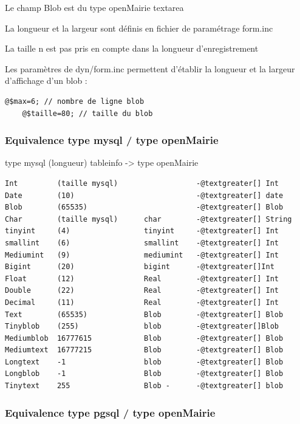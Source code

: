 \documentclass[letterpaper,10pt,french]{manual}
\begin{document}
Le champ Blob est du type openMairie textarea

La longueur et la largeur sont définis en fichier de paramétrage form.inc

La taille n est pas pris en compte dans la longueur d'enregistrement

Les paramètres de dyn/form.inc permettent d'établir la longueur et la largeur d'affichage d'un blob :

\begin{Verbatim}[commandchars=@\[\]]
@$max=6; // nombre de ligne blob
    @$taille=80; // taille du blob
\end{Verbatim}


\subsubsection{Equivalence type mysql / type openMairie}

type mysql (longueur)          tableinfo   -\textgreater{} type openMairie

\begin{Verbatim}[commandchars=@\[\]]
Int         (taille mysql)                  -@textgreater[] Int
Date        (10)                            -@textgreater[] date
Blob        (65535)                         -@textgreater[] Blob
Char        (taille mysql)      char        -@textgreater[] String
tinyint     (4)                 tinyint     -@textgreater[] Int
smallint    (6)                 smallint    -@textgreater[] Int
Mediumint   (9)                 mediumint   -@textgreater[] Int
Bigint      (20)                bigint      -@textgreater[]Int
Float       (12)                Real        -@textgreater[] Int
Double      (22)                Real        -@textgreater[] Int
Decimal     (11)                Real        -@textgreater[] Int
Text        (65535)             Blob        -@textgreater[] Blob
Tinyblob    (255)               blob        -@textgreater[]Blob
Mediumblob  16777615            Blob        -@textgreater[] Blob
Mediumtext  16777215            Blob        -@textgreater[] Blob
Longtext    -1                  blob        -@textgreater[] Blob
Longblob    -1                  Blob        -@textgreater[] Blob
Tinytext    255                 Blob -      -@textgreater[] blob
\end{Verbatim}


\subsubsection{Equivalence type pgsql / type openMairie}
\end{document}
